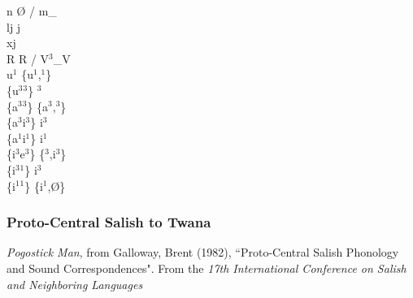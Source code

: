 \documentclass[11pt]{article}
\begin{document}
n \textrightarrow\hspace{0pt} \O\hspace{0pt} / m_ \\
l\super j \textrightarrow\hspace{0pt} j \\
x\super j \textrightarrow\hspace{0pt}  \\
R \textrightarrow\hspace{0pt} R / V$^3$_V \\
u$^1$ \textrightarrow\hspace{0pt} \{u$^1$,$^1$\} \\
\{u$^3$\raisebox{-0.7ex}{\textasciitilde}$^3$\} \textrightarrow\hspace{0pt} $^3$ \\
\{a$^3$\raisebox{-0.7ex}{\textasciitilde}$^3$\} \textrightarrow\hspace{0pt} \{a$^3$,$^3$\} \\
\{a$^3$\raisebox{-0.7ex}{\textasciitilde}i$^3$\} \textrightarrow\hspace{0pt} i$^3$ \\
\{a$^1$\raisebox{-0.7ex}{\textasciitilde}i$^1$\} \textrightarrow\hspace{0pt} i$^1$ \\
\{i$^3$\raisebox{-0.7ex}{\textasciitilde}e$^3$\} \textrightarrow\hspace{0pt} \{$^3$,i$^3$\} \\
\{i$^3$\raisebox{-0.7ex}{\textasciitilde}$^1$\} \textrightarrow\hspace{0pt} i$^3$ \\
\{i$^1$\raisebox{-0.7ex}{\textasciitilde}$^1$\} \textrightarrow\hspace{0pt} \{i$^1$,\O\}

\subsubsection{Proto-Central Salish to Twana}\textit{Pogostick Man}, from Galloway, Brent (1982), \textquotedblleft Proto-Central Salish Phonology and Sound Correspondences". From the \textit{17th International Conference on Salish and Neighboring Languages}
\end{document}
